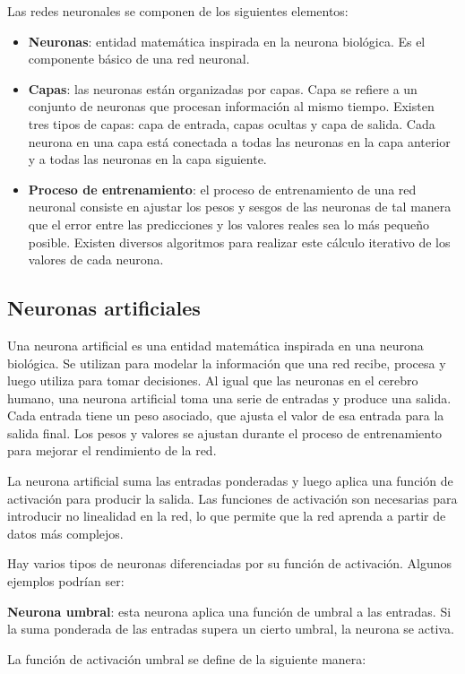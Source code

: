 Las redes neuronales se componen de los siguientes elementos:
\begin{itemize}
\tightlist
\item \textbf{Neuronas}: entidad matemática inspirada en la neurona biológica. Es el componente básico de una red neuronal. 
\item \textbf{Capas}: las neuronas están organizadas por capas. Capa se refiere a un conjunto de neuronas que procesan información al mismo tiempo. Existen tres tipos de capas: capa de entrada, capas ocultas y capa de salida. Cada neurona en una capa está conectada a todas las neuronas en la capa anterior y a todas las neuronas en la capa siguiente.
\item \textbf{Proceso de entrenamiento}: el proceso de entrenamiento de una red neuronal consiste en ajustar los pesos y sesgos de las neuronas de tal manera que el error entre las predicciones y los valores reales sea lo más pequeño posible. Existen diversos algoritmos para realizar este cálculo iterativo de los valores de cada neurona.
\end{itemize}

\subsection{Neuronas artificiales}
Una neurona artificial es una entidad matemática inspirada en una neurona biológica. Se utilizan para modelar la información que una red recibe, procesa y luego utiliza para tomar decisiones.
Al igual que las neuronas en el cerebro humano, una neurona artificial toma una serie de entradas y produce una salida. Cada entrada tiene un peso asociado, que ajusta el valor de esa entrada para la salida final. Los pesos y valores se ajustan durante el proceso de entrenamiento para mejorar el rendimiento de la red.

La neurona artificial suma las entradas ponderadas y luego aplica una función de activación para producir la salida. Las funciones de activación son necesarias para introducir no linealidad en la red, lo que permite que la red aprenda a partir de datos más complejos.

Hay varios tipos de neuronas diferenciadas por su función de activación. Algunos ejemplos podrían ser:

\textbf{Neurona umbral}: esta neurona aplica una función de umbral a las entradas. Si la suma ponderada de las entradas supera un cierto umbral, la neurona se activa.

La función de activación umbral se define de la siguiente manera:

